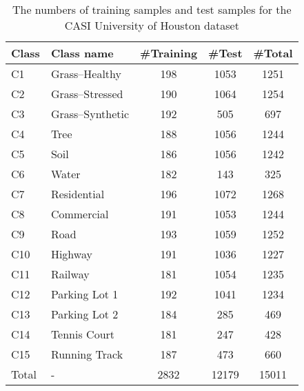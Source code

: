 \documentclass[journal]{IEEEtran}
\begin{document}
\begin{table}[htb]
  \caption{The numbers of training samples and test samples for the CASI University of Houston dataset
    \label{tab:grss2013_samples}}
  \centering
  \renewcommand{\arraystretch}{1.5}
  \begin{tabular}{l|l|c|c|c}
    \hline
    Class & Class name      & \#Training & \#Test & \#Total \\
    \hline
    C1    & Grass–Healthy   & 198        & 1053   & 1251    \\
    C2    & Grass–Stressed  & 190        & 1064   & 1254    \\
    C3    & Grass–Synthetic & 192        & 505    & 697     \\
    C4    & Tree            & 188        & 1056   & 1244    \\
    C5    & Soil            & 186        & 1056   & 1242    \\
    C6    & Water           & 182        & 143    & 325     \\
    C7    & Residential     & 196        & 1072   & 1268    \\
    C8    & Commercial      & 191        & 1053   & 1244    \\
    C9    & Road            & 193        & 1059   & 1252    \\
    C10   & Highway         & 191        & 1036   & 1227    \\
    C11   & Railway         & 181        & 1054   & 1235    \\
    C12   & Parking Lot 1   & 192        & 1041   & 1234    \\
    C13   & Parking Lot 2   & 184        & 285    & 469     \\
    C14   & Tennis Court    & 181        & 247    & 428     \\
    C15   & Running Track   & 187        & 473    & 660     \\
    \hline
    Total & -               & 2832       & 12179  & 15011   \\
    \hline
  \end{tabular}
\end{table}
\end{document}
